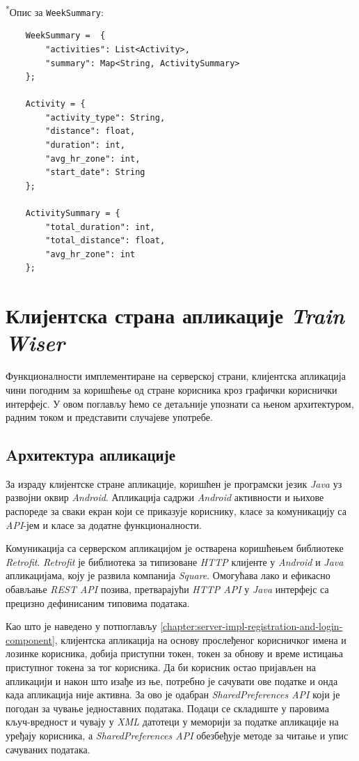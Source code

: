 \documentclass[12pt,oneside]{memoir}
\begin{document}
\noindent \textsuperscript{*}Опис за \texttt{WeekSummary}:

\begin{lstlisting}
    WeekSummary =  {
        "activities": List<Activity>,
        "summary": Map<String, ActivitySummary>
    };
    
    Activity = {
        "activity_type": String,
        "distance": float,
        "duration": int,
        "avg_hr_zone": int,
        "start_date": String
    };
    
    ActivitySummary = {
        "total_duration": int,
        "total_distance": float,
        "avg_hr_zone": int
    };
\end{lstlisting}

\chapter{Клијентска страна апликације \textit{Train Wiser}}\label{chapter:impl-client-app}

Функционалности имплементиране на серверској страни, клијентска апликација чини погодним за коришћење од стране корисника кроз графички кориснички интерфејс. У овом поглављу ћемо се детаљније упознати са њеном архитектуром, радним током и представити случајеве употребе.


\section{Aрхитектура апликације}

За израду клијентске стране апликације, коришћен је програмски језик \textit{Java} уз развојни оквир \textit{Android}. Апликација садржи \textit{Android} активности и њихове распореде за сваки екран који се приказује кориснику, класе за комуникацију са \textit{API}-јем и класе за додатне функционалности.

Комуникација са серверском апликацијом је остварена коришћењем библиотеке \textit{Retrofit}. \textit{Retrofit} \cite{retrofit} је библиотека за типизоване \textit{HTTP} клијенте у \textit{Android} и \textit{Java} апликацијама, коју је развила компанија \textit{Square}. Омогућава лако и ефикасно обављање \textit{REST API} позива, претварајући \textit{HTTP API} у \textit{Java} интерфејс са прецизно дефинисаним типовима података. 

Као што је наведено у потпоглављу \ref{chapter:server-impl-registration-and-login-component}, клијентска апликација на основу прослеђеног корисничког имена и лозинке корисника, добија приступни токен, токен за обнову и време истицања приступног токена за тог корисника. Да би корисник остао пријављен на апликацији и након што изађе из ње, потребно је сачувати ове податке и онда када апликација није активна. За ово је одабран \textit{SharedPreferences API} \cite{shared_preference} који је погодан за чување једноставних података. Подаци се складиште у паровима кључ-вредност и чувају у \textit{XML} датотеци у меморији за податке апликације на уређају корисника, а \textit{SharedPreferences API} обезбеђује методе за читање и упис сачуваних података.
\end{document}
